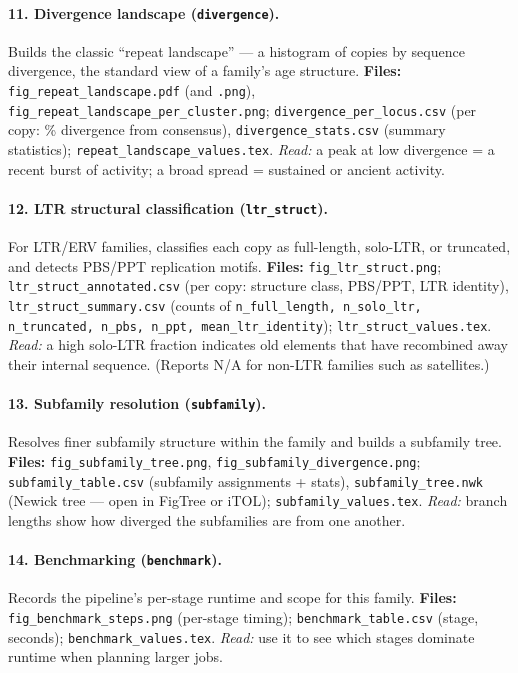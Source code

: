 \documentclass[11pt]{article}
\begin{document}
\paragraph{11. Divergence landscape (\texttt{divergence}).}
Builds the classic ``repeat landscape'' --- a histogram of copies by
sequence divergence, the standard view of a family's age structure.
\textbf{Files:} \texttt{fig\_repeat\_landscape.pdf} (and \texttt{.png}),
\texttt{fig\_repeat\_landscape\_per\_cluster.png};
\texttt{divergence\_per\_locus.csv} (per copy: \% divergence from
consensus), \texttt{divergence\_stats.csv} (summary statistics);
\texttt{repeat\_landscape\_values.tex}.
\emph{Read:} a peak at low divergence = a recent burst of activity; a broad
spread = sustained or ancient activity.

\paragraph{12. LTR structural classification (\texttt{ltr\_struct}).}
For LTR/ERV families, classifies each copy as full-length, solo-LTR, or
truncated, and detects PBS/PPT replication motifs.
\textbf{Files:} \texttt{fig\_ltr\_struct.png};
\texttt{ltr\_struct\_annotated.csv} (per copy: structure class, PBS/PPT,
LTR identity), \texttt{ltr\_struct\_summary.csv} (counts of
\texttt{n\_full\_length, n\_solo\_ltr, n\_truncated, n\_pbs, n\_ppt,
mean\_ltr\_identity}); \texttt{ltr\_struct\_values.tex}.
\emph{Read:} a high solo-LTR fraction indicates old elements that have
recombined away their internal sequence. (Reports N/A for non-LTR
families such as satellites.)

\paragraph{13. Subfamily resolution (\texttt{subfamily}).}
Resolves finer subfamily structure within the family and builds a
subfamily tree.
\textbf{Files:} \texttt{fig\_subfamily\_tree.png},
\texttt{fig\_subfamily\_divergence.png};
\texttt{subfamily\_table.csv} (subfamily assignments + stats),
\texttt{subfamily\_tree.nwk} (Newick tree --- open in FigTree or iTOL);
\texttt{subfamily\_values.tex}.
\emph{Read:} branch lengths show how diverged the subfamilies are from one
another.

\paragraph{14. Benchmarking (\texttt{benchmark}).}
Records the pipeline's per-stage runtime and scope for this family.
\textbf{Files:} \texttt{fig\_benchmark\_steps.png} (per-stage timing);
\texttt{benchmark\_table.csv} (stage, seconds);
\texttt{benchmark\_values.tex}.
\emph{Read:} use it to see which stages dominate runtime when planning
larger jobs.
\end{document}
